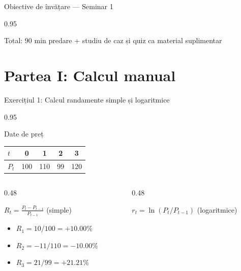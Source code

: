 \documentclass[9pt, aspectratio=169, t]{beamer}
\begin{document}
\begin{frame}{Obiective de învățare --- Seminar 1}
\begin{cminipage}{0.95\textwidth}
\begin{center}
    \vspace{0.1cm}
    {\footnotesize\textcolor{MediumGray}{Total: 90 min predare + studiu de caz și quiz ca material suplimentar}}
    \end{center}
    \end{cminipage}
\end{frame}

\section{Partea I: Calcul manual}

\begin{frame}[shrink=5]{Exercițiul 1: Calcul randamente simple și logaritmice}
    \begin{cminipage}{0.95\textwidth}
    \begin{block}{Date de preț}
    \begin{center}
    {\small\renewcommand{\arraystretch}{1.3}
    \begin{tabular}{lcccc}
    \toprule
    $t$ & 0 & 1 & 2 & 3 \\
    \midrule
    $P_t$ & 100 & 110 & 99 & 120 \\
    \bottomrule
    \end{tabular}}
    \end{center}
    \end{block}
    \vspace{0.1cm}
    \begin{columns}[T]
    \begin{column}{0.48\textwidth}
    \begin{exampleblock}{$R_t = \frac{P_t - P_{t-1}}{P_{t-1}}$ (simple)}
    \begin{itemize}\setlength{\itemsep}{0pt}
        \item $R_1 = 10/100 = \mathbf{+10.00\%}$
        \item $R_2 = -11/110 = \mathbf{-10.00\%}$
        \item $R_3 = 21/99 = \mathbf{+21.21\%}$
    \end{itemize}
    \end{exampleblock}
    \end{column}
    \begin{column}{0.48\textwidth}
    \begin{exampleblock}{$r_t = \ln(P_t / P_{t-1})$ (logaritmice)}

\end{exampleblock}
\end{column}
\end{columns}
\end{cminipage}
\end{frame}
\end{document}
